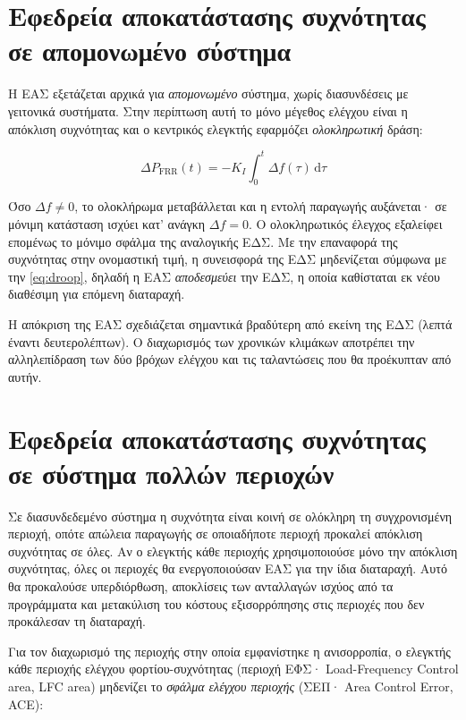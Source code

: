 \section{Εφεδρεία αποκατάστασης συχνότητας σε απομονωμένο σύστημα}
\label{sec:frr-single}

Η ΕΑΣ εξετάζεται αρχικά για \emph{απομονωμένο} σύστημα, χωρίς διασυνδέσεις με γειτονικά
συστήματα. Στην περίπτωση αυτή το μόνο μέγεθος ελέγχου είναι η απόκλιση συχνότητας και ο
κεντρικός ελεγκτής εφαρμόζει \emph{ολοκληρωτική} δράση:

\begin{equation}
\Delta P_{\mathrm{FRR}}(t) = -K_I \int_0^{t} \Delta f(\tau)\,\mathrm{d}\tau
\label{eq:frr-isolated}
\end{equation}

Όσο $\Delta f \neq 0$, το ολοκλήρωμα μεταβάλλεται και η εντολή παραγωγής αυξάνεται· σε μόνιμη
κατάσταση ισχύει κατ' ανάγκη $\Delta f = 0$. Ο ολοκληρωτικός έλεγχος εξαλείφει επομένως το
μόνιμο σφάλμα της αναλογικής ΕΔΣ. Με την επαναφορά της συχνότητας στην ονομαστική τιμή, η
συνεισφορά της ΕΔΣ μηδενίζεται σύμφωνα με την \eqref{eq:droop}, δηλαδή η ΕΑΣ
\emph{αποδεσμεύει} την ΕΔΣ, η οποία καθίσταται εκ νέου διαθέσιμη για επόμενη διαταραχή.

Η απόκριση της ΕΑΣ σχεδιάζεται σημαντικά βραδύτερη από εκείνη της ΕΔΣ (λεπτά έναντι
δευτερολέπτων). Ο διαχωρισμός των χρονικών κλιμάκων αποτρέπει την αλληλεπίδραση των δύο
βρόχων ελέγχου και τις ταλαντώσεις που θα προέκυπταν από αυτήν.

\section{Εφεδρεία αποκατάστασης συχνότητας σε σύστημα πολλών περιοχών}
\label{sec:frr-multi}

Σε διασυνδεδεμένο σύστημα η συχνότητα είναι κοινή σε ολόκληρη τη συγχρονισμένη περιοχή,
οπότε απώλεια παραγωγής σε οποιαδήποτε περιοχή προκαλεί απόκλιση συχνότητας σε όλες. Αν ο
ελεγκτής κάθε περιοχής χρησιμοποιούσε μόνο την απόκλιση συχνότητας, όλες οι περιοχές θα
ενεργοποιούσαν ΕΑΣ για την ίδια διαταραχή. Αυτό θα προκαλούσε υπερδιόρθωση, αποκλίσεις των
ανταλλαγών ισχύος από τα προγράμματα και μετακύλιση του κόστους εξισορρόπησης στις περιοχές
που δεν προκάλεσαν τη διαταραχή.

Για τον διαχωρισμό της περιοχής στην οποία εμφανίστηκε η ανισορροπία, ο ελεγκτής κάθε
περιοχής ελέγχου φορτίου-συχνότητας (περιοχή ΕΦΣ· Load-Frequency Control area, LFC area) μηδενίζει το \emph{σφάλμα ελέγχου
περιοχής} (ΣΕΠ· Area Control Error, ACE):

